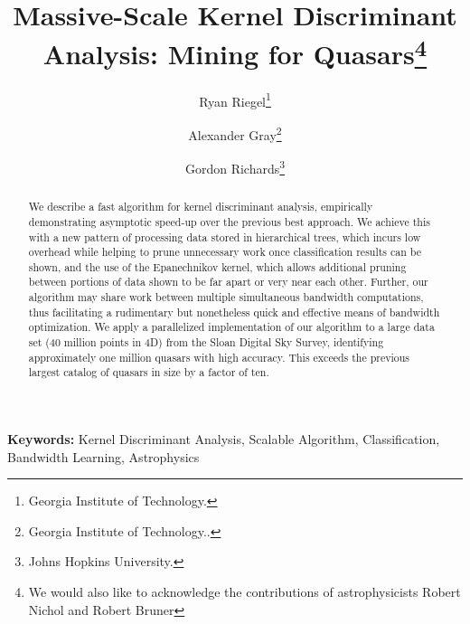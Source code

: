 \documentclass[twoside,leqno,twocolumn]{article}
\begin{document}

\title{\Large Massive-Scale Kernel Discriminant Analysis: Mining for Quasars\thanks{We would also like to acknowledge the contributions of astrophysicists Robert Nichol and Robert Bruner}}
\author{Ryan Riegel\thanks{Georgia Institute of Technology.} \\
  \and Alexander Gray\thanks{Georgia Institute of Technology..} \\
  \and Gordon Richards\thanks{Johns Hopkins University.}}
\date{}

\maketitle


\begin{abstract} \small\baselineskip=9pt
  We describe a fast algorithm for kernel discriminant analysis,
  empirically demonstrating asymptotic speed-up over the previous best
  approach.  We achieve this with a new pattern of processing data
  stored in hierarchical trees, which incurs low overhead while
  helping to prune unnecessary work once classification results can be
  shown, and the use of the Epanechnikov kernel, which allows
  additional pruning between portions of data shown to be far apart or
  very near each other.  Further, our algorithm may share work between
  multiple simultaneous bandwidth computations, thus facilitating a
  rudimentary but nonetheless quick and effective means of bandwidth
  optimization.  We apply a parallelized implementation of our
  algorithm to a large data set (40 million points in 4D) from the
  Sloan Digital Sky Survey, identifying approximately one million
  quasars with high accuracy.  This exceeds the previous largest
  catalog of quasars in size by a factor of ten.
\end{abstract}

{\bf Keywords:} Kernel Discriminant Analysis, Scalable Algorithm, Classification, Bandwidth Learning, Astrophysics
\end{document}
